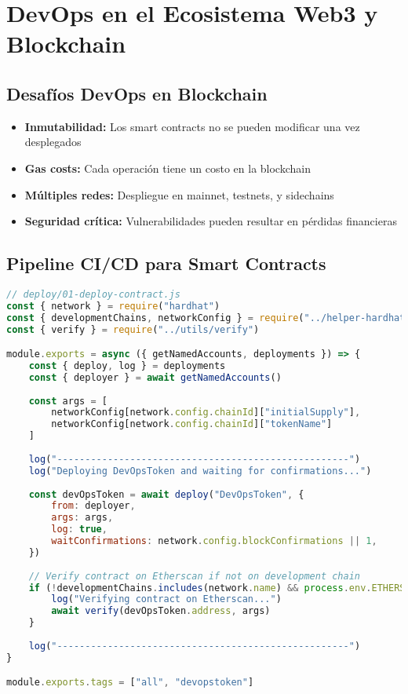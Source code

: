 \documentclass[12pt,a4paper]{article}
\begin{document}
\section{DevOps en el Ecosistema Web3 y Blockchain}

\subsection{Desafíos DevOps en Blockchain}
\begin{itemize}
    \item \textbf{Inmutabilidad:} Los smart contracts no se pueden modificar una vez desplegados
    \item \textbf{Gas costs:} Cada operación tiene un costo en la blockchain
    \item \textbf{Múltiples redes:} Despliegue en mainnet, testnets, y sidechains
    \item \textbf{Seguridad crítica:} Vulnerabilidades pueden resultar en pérdidas financieras
\end{itemize}

\subsection{Pipeline CI/CD para Smart Contracts}
\begin{lstlisting}[language=javascript, caption=Hardhat deployment script para smart contracts]
// deploy/01-deploy-contract.js
const { network } = require("hardhat")
const { developmentChains, networkConfig } = require("../helper-hardhat-config")
const { verify } = require("../utils/verify")

module.exports = async ({ getNamedAccounts, deployments }) => {
    const { deploy, log } = deployments
    const { deployer } = await getNamedAccounts()
    
    const args = [
        networkConfig[network.config.chainId]["initialSupply"],
        networkConfig[network.config.chainId]["tokenName"]
    ]
    
    log("----------------------------------------------------")
    log("Deploying DevOpsToken and waiting for confirmations...")
    
    const devOpsToken = await deploy("DevOpsToken", {
        from: deployer,
        args: args,
        log: true,
        waitConfirmations: network.config.blockConfirmations || 1,
    })
    
    // Verify contract on Etherscan if not on development chain
    if (!developmentChains.includes(network.name) && process.env.ETHERSCAN_API_KEY) {
        log("Verifying contract on Etherscan...")
        await verify(devOpsToken.address, args)
    }
    
    log("----------------------------------------------------")
}

module.exports.tags = ["all", "devopstoken"]
\end{lstlisting}
\end{document}
